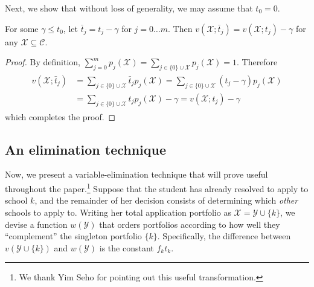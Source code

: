 Next, we show that without loss of generality, we may assume that $t_0 = 0$.

\begin{lemma} \label{assumetzerozero}
For some $\gamma \leq t_0$, let $\bar t_j = t_j - \gamma$ for $j = 0 \dots m$. Then $v(\mathcal{X}; \bar t_j) = v(\mathcal{X};  t_j) -  \gamma$ for any $\mathcal{X} \subseteq \mathcal{C}$. 
\end{lemma}
\begin{proof}
By definition, $\sum_{j=0}^m p_j(\mathcal{X}) = \sum_{j \in \{0\}\cup\mathcal{X}} p_j(\mathcal{X}) = 1$. Therefore
\begin{align}
\begin{split}
v(\mathcal{X}; \bar t_j) &= \sum_{j\in \{0\}\cup\mathcal{X}}  \bar t_j p_j(\mathcal{X})
=\sum_{j\in \{0\}\cup\mathcal{X}} (t_j - \gamma) p_j(\mathcal{X}) \\
&=\sum_{j\in \{0\}\cup\mathcal{X}} t_j p_j(\mathcal{X})  - \gamma 
= v(\mathcal{X}; t_j) - \gamma
\end{split} 
\end{align}
which completes the proof.
\end{proof}


\subsection{An elimination technique} \label{eliminationtechniquesection}

Now, we present a variable-elimination technique that will prove useful throughout the paper.\footnote{We thank Yim Seho for pointing out this useful transformation.} Suppose that the student has already resolved to apply to school $k$, and the remainder of her decision consists of determining which \emph{other} schools to apply to. Writing her total application portfolio as $\mathcal{X} = \mathcal{Y} \cup \{k\}$, we devise a function $w(\mathcal{Y})$ that orders portfolios according to how well they ``complement'' the singleton portfolio $\{k\}$. Specifically, the difference between $v(\mathcal{Y} \cup\{k\})$ and $w(\mathcal{Y})$ is the constant $f_k t_k$.

